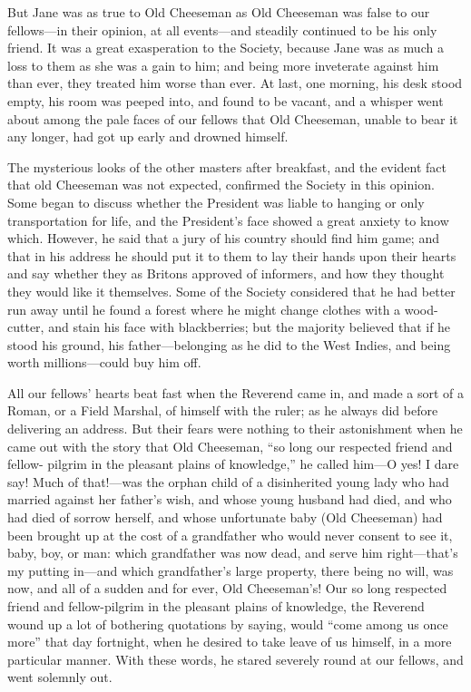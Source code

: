 But Jane was as true to Old Cheeseman as Old Cheeseman was false to
our fellows---in their opinion, at all events---and steadily continued
to be his only friend.  It was a great exasperation to the Society,
because Jane was as much a loss to them as she was a gain to him;
and being more inveterate against him than ever, they treated him
worse than ever.  At last, one morning, his desk stood empty, his
room was peeped into, and found to be vacant, and a whisper went
about among the pale faces of our fellows that Old Cheeseman, unable
to bear it any longer, had got up early and drowned himself.

The mysterious looks of the other masters after breakfast, and the
evident fact that old Cheeseman was not expected, confirmed the
Society in this opinion.  Some began to discuss whether the
President was liable to hanging or only transportation for life, and
the President's face showed a great anxiety to know which.  However,
he said that a jury of his country should find him game; and that in
his address he should put it to them to lay their hands upon their
hearts and say whether they as Britons approved of informers, and
how they thought they would like it themselves.  Some of the Society
considered that he had better run away until he found a forest where
he might change clothes with a wood-cutter, and stain his face with
blackberries; but the majority believed that if he stood his ground,
his father---belonging as he did to the West Indies, and being worth
millions---could buy him off.

All our fellows' hearts beat fast when the Reverend came in, and
made a sort of a Roman, or a Field Marshal, of himself with the
ruler; as he always did before delivering an address.  But their
fears were nothing to their astonishment when he came out with the
story that Old Cheeseman, ``so long our respected friend and fellow-%
pilgrim in the pleasant plains of knowledge,'' he called him---O yes!
I dare say!  Much of that!---was the orphan child of a disinherited
young lady who had married against her father's wish, and whose
young husband had died, and who had died of sorrow herself, and
whose unfortunate baby (Old Cheeseman) had been brought up at the
cost of a grandfather who would never consent to see it, baby, boy,
or man:  which grandfather was now dead, and serve him right---that's
my putting in---and which grandfather's large property, there being
no will, was now, and all of a sudden and for ever, Old Cheeseman's!
Our so long respected friend and fellow-pilgrim in the pleasant
plains of knowledge, the Reverend wound up a lot of bothering
quotations by saying, would ``come among us once more'' that day
fortnight, when he desired to take leave of us himself, in a more
particular manner.  With these words, he stared severely round at
our fellows, and went solemnly out.

